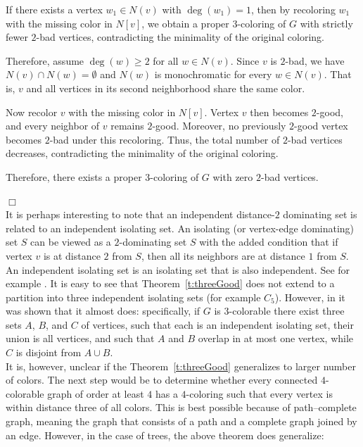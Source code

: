 \documentclass[a4paper,11pt]{article}
\numberwithin{equation}{theorem}
\begin{document}
If there exists a vertex $w_1 \in N(v)$ with $\deg(w_1)=1$, 
then by recoloring $w_1$ with the missing color in $N[v]$, 
we obtain a proper $3$-coloring of $G$ with strictly fewer $2$-bad vertices, 
contradicting the minimality of the original coloring.

Therefore, assume $\deg(w) \geq 2$ for all $w \in N(v)$. 
Since $v$ is $2$-bad, we have $N(v) \cap N(w) = \emptyset$ and $N(w)$ is monochromatic for every $w \in N(v)$. 
That is, $v$ and all vertices in its second neighborhood share the same color.

Now recolor $v$ with the missing color in $N[v]$. 
Vertex $v$ then becomes $2$-good, and every neighbor of $v$ remains $2$-good. 
Moreover, no previously $2$-good vertex becomes $2$-bad under this recoloring. 
Thus, the total number of $2$-bad vertices decreases, 
contradicting the minimality of the original coloring.

Therefore, there exists a proper $3$-coloring of $G$ with zero $2$-bad vertices.

\hfill$\Box$\\

It is perhaps interesting to note that an independent distance-$2$ dominating set is related
to an independent isolating set. An isolating (or vertex-edge dominating) set $S$ can be 
viewed as a $2$-dominating set $S$ with the added condition that if vertex $v$ is at distance $2$ 
from $S$, then all its neighbors are at distance $1$ from $S$. An independent 
isolating set is an isolating set that is also independent. See for example
\cite{BCHH,BGindep,FK}. 
It is easy to see that Theorem~\ref{t:threeGood} does not extend to a partition into three independent
isolating sets (for example $C_5$). However, in \cite{BGindep} it was shown that 
it almost does: specifically, if $G$ is $3$-colorable there exist three sets $A$, $B$, and $C$ of vertices,
such that each is an independent isolating set, their union is all vertices, 
and such that $A$ and $B$ 
overlap in at most one vertex, while $C$ is disjoint from $A \cup B$.\\

It is, however, unclear if the Theorem~\ref{t:threeGood} generalizes to larger number of colors.
The next step would be to determine whether every connected $4$-colorable
graph of order at least $4$ has a $4$-coloring such that every vertex is within distance three of all colors.
This is best possible because of path--complete graph, meaning the graph that consists of a path and a complete graph joined
by an edge.
However, in the case of trees, the above theorem does generalize:
\end{document}
